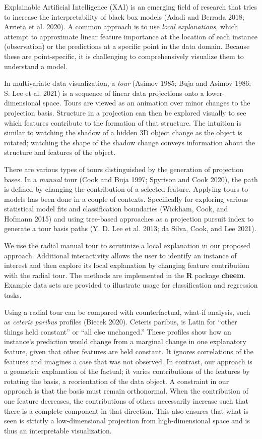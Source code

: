 \documentclass[11pt,twoside]{article}
\begin{document}
Explainable Artificial Intelligence (XAI) is an emerging field of research that tries to increase the interpretability of black box models (Adadi and Berrada 2018; Arrieta et al. 2020). A common approach is to use \emph{local explanations}, which attempt to approximate linear feature importance at the location of each instance (observation) or the predictions at a specific point in the data domain. Because these are point-specific, it is challenging to comprehensively visualize them to understand a model.

In multivariate data visualization, a \emph{tour} (Asimov 1985; Buja and Asimov 1986; S. Lee et al. 2021) is a sequence of linear data projections onto a lower-dimensional space. Tours are viewed as an animation over minor changes to the projection basis. Structure in a projection can then be explored visually to see which features contribute to the formation of that structure. The intuition is similar to watching the shadow of a hidden 3D object change as the object is rotated; watching the shape of the shadow change conveys information about the structure and features of the object.

There are various types of tours distinguished by the generation of projection bases. In a \emph{manual} tour (Cook and Buja 1997; Spyrison and Cook 2020), the path is defined by changing the contribution of a selected feature. Applying tours to models has been done in a couple of contexts. Specifically for exploring various statistical model fits and classification boundaries (Wickham, Cook, and Hofmann 2015) and using tree-based approaches as a projection pursuit index to generate a tour basis paths (Y. D. Lee et al. 2013; da Silva, Cook, and Lee 2021).

We use the radial manual tour to scrutinize a local explanation in our proposed approach. Additional interactivity allows the user to identify an instance of interest and then explore its local explanation by changing feature contribution with the radial tour. The methods are implemented in the \textbf{R} package \textbf{cheem}. Example data sets are provided to illustrate usage for classification and regression tasks.

Using a radial tour can be compared with counterfactual, what-if analysis, such as \emph{ceteris paribus} profiles (Biecek 2020). Ceteris paribus, is Latin for ``other things held constant'' or ``all else unchanged.'' These profiles show how an instance's prediction would change from a marginal change in one explanatory feature, given that other features are held constant. It ignores correlations of the features and imagines a case that was not observed. In contrast, our approach is a geometric explanation of the factual; it varies contributions of the features by rotating the basis, a reorientation of the data object. A constraint in our approach is that the basis must remain orthonormal. When the contribution of one feature decreases, the contributions of others necessarily increase such that there is a complete component in that direction. This also ensures that what is seen is strictly a low-dimensional projection from high-dimensional space and is thus an interpretable visualization.
\end{document}
